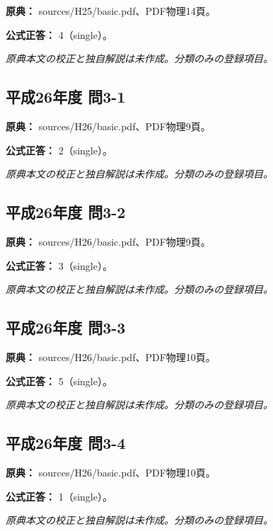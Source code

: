 \noindent\textbf{原典：} sources/H25/basic.pdf、PDF物理14頁。

\textbf{公式正答：} 4（single）。

\par\textit{原典本文の校正と独自解説は未作成。分類のみの登録項目。}

\subsection{平成26年度 問3-1}
\label{q:h26-reg-basic-3-1}

\noindent\textbf{原典：} sources/H26/basic.pdf、PDF物理9頁。

\textbf{公式正答：} 2（single）。

\par\textit{原典本文の校正と独自解説は未作成。分類のみの登録項目。}

\subsection{平成26年度 問3-2}
\label{q:h26-reg-basic-3-2}

\noindent\textbf{原典：} sources/H26/basic.pdf、PDF物理9頁。

\textbf{公式正答：} 3（single）。

\par\textit{原典本文の校正と独自解説は未作成。分類のみの登録項目。}

\subsection{平成26年度 問3-3}
\label{q:h26-reg-basic-3-3}

\noindent\textbf{原典：} sources/H26/basic.pdf、PDF物理10頁。

\textbf{公式正答：} 5（single）。

\par\textit{原典本文の校正と独自解説は未作成。分類のみの登録項目。}

\subsection{平成26年度 問3-4}
\label{q:h26-reg-basic-3-4}

\noindent\textbf{原典：} sources/H26/basic.pdf、PDF物理10頁。

\textbf{公式正答：} 1（single）。

\par\textit{原典本文の校正と独自解説は未作成。分類のみの登録項目。}

